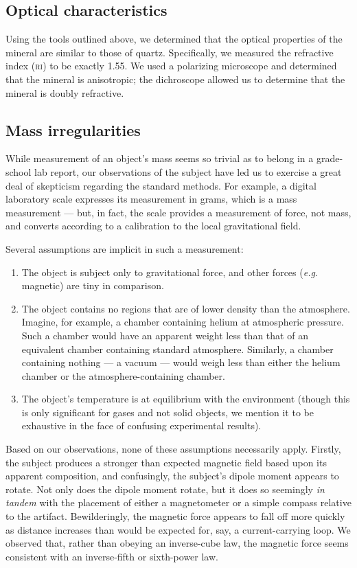 \documentclass[10pt]{article}
\begin{document}
\subsection{Optical characteristics}
Using the tools outlined above, we determined that the optical properties of the mineral are similar to those of quartz.
Specifically, we measured the refractive index (\textsc{ri}) to be exactly 1.55.
We used a polarizing microscope and determined that the mineral is anisotropic; the dichroscope allowed us to determine that the mineral is doubly refractive.

\subsection{Mass irregularities}
While measurement of an object's mass seems so trivial as to belong in a grade-school lab report, our observations of the subject have led us to exercise a great deal of skepticism regarding the standard methods.
For example, a digital laboratory scale expresses its measurement in grams, which is a mass measurement --- but, in fact, the scale provides a measurement of force, not mass, and converts according to a calibration to the local gravitational field.

Several assumptions are implicit in such a measurement:
\begin{enumerate}
\item The object is subject only to gravitational force, and other forces (\textit{e.g.} magnetic) are tiny in comparison.
\item The object contains no regions that are of lower density than the atmosphere. Imagine, for example, a chamber containing helium at atmospheric pressure. Such a chamber would have an apparent weight less than that of an equivalent chamber containing standard atmosphere. Similarly, a chamber containing nothing --- a vacuum --- would weigh less than either the helium chamber or the atmosphere-containing chamber.
\item The object's temperature is at equilibrium with the environment (though this is only significant for gases and not solid objects, we mention it to be exhaustive in the face of confusing experimental results).
\end{enumerate}

Based on our observations, none of these assumptions necessarily apply.
Firstly, the subject produces a stronger than expected magnetic field based upon its apparent composition, and confusingly, the subject's dipole moment appears to rotate.
Not only does the dipole moment rotate, but it does so seemingly \textit{in tandem} with the placement of either a magnetometer or a simple compass relative to the artifact.
Bewilderingly, the magnetic force appears to fall off more quickly as distance increases than would be expected for, say, a current-carrying loop.
We observed that, rather than obeying an inverse-cube law, the magnetic force seems consistent with an inverse-fifth or sixth-power law.
\end{document}
